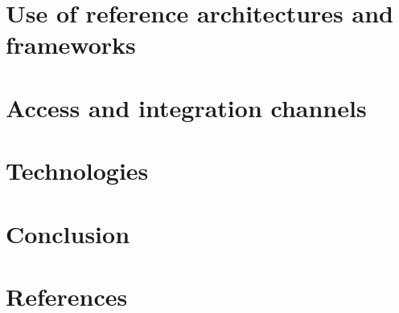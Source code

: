 \documentclass[12pt]{article}
\begin{document}
\section{Use of reference architectures and frameworks}

\section{Access and integration channels}

\section{Technologies}

\section{Conclusion}

\section{References}
\end{document}
